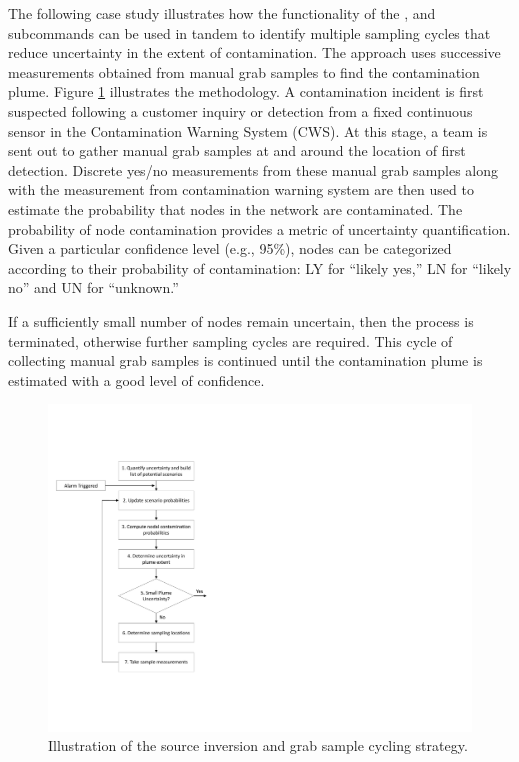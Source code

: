 \label{sampling_case_study}
The following case study illustrates how the functionality of the ,  and  subcommands 
can be used in tandem to identify multiple sampling cycles that reduce uncertainty in the extent of contamination.
The approach uses successive measurements obtained from manual grab samples to find the contamination plume.  
Figure \ref{fig:ureduction_flowchart} illustrates the methodology.
A contamination incident is first suspected following a customer inquiry or detection from a fixed continuous 
sensor in the Contamination Warning System (CWS). 
At this stage, a team is sent out to gather manual grab samples at and around the location of first detection. 
Discrete yes/no measurements from these manual grab samples along with the measurement from contamination warning system 
are then used to estimate the probability that nodes in the network are contaminated.
The probability of node contamination provides a metric of uncertainty quantification. Given a particular confidence level (e.g., 95\%), 
nodes can be categorized according to their probability of contamination: LY for ``likely yes,'' LN for ``likely no'' and UN for ``unknown.''  

If a sufficiently small number of nodes remain uncertain, then the process is terminated, otherwise further sampling cycles are required. 
This cycle of collecting manual grab samples is continued until the contamination plume is estimated with a good level of confidence. 
\begin{figure}[!ht]
\begin{center}
\includegraphics[scale=0.6]{graphics/uncertaintyprocess3.pdf}
\caption{Illustration of the source inversion and grab sample cycling strategy.}
\label{fig:ureduction_flowchart}
\end{center}
\end{figure}

